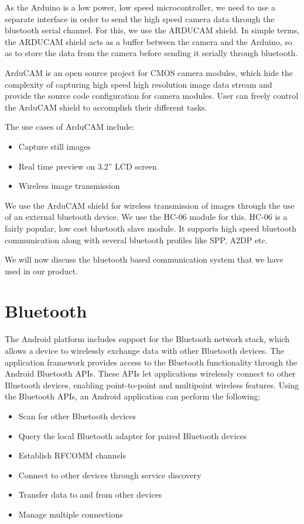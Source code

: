 \documentclass[11pt]{report}
\begin{document}
{{As the Arduino is a low power, low speed microcontroller, we need to use a separate interface in order to send the high speed camera data through the bluetooth serial channel. For this, we use the ARDUCAM shield. In simple terms, the ARDUCAM shield acts as a buffer between the camera and the Arduino, so as to store the data from the camera before sending it serially through bluetooth.

ArduCAM is an open source project for CMOS camera modules, which hide the complexity of capturing high speed high resolution image data stream and provide the source code configuration for camera modules. User can freely control the ArduCAM shield to accomplish their different tasks.

The use cases of ArduCAM include:

\begin{itemize}
\item Capture still images
\item Real time preview on 3.2” LCD screen
\item Wireless image transmission
\end{itemize}

We use the ArduCAM shield for wireless transmission of images through the use of an external bluetooth device. We use the HC-06 module for this. HC-06 is a fairly popular, low cost bluetooth slave module. It supports high speed bluetooth communication along with several bluetooth profiles like SPP, A2DP etc.

We will now discuss the bluetooth based communication system that we have used in our product.
\section{Bluetooth}
The Android platform includes support for the Bluetooth network stack, which allows a device to wirelessly exchange data with other Bluetooth devices. The application framework provides access to the Bluetooth functionality through the Android Bluetooth APIs\cite{androiddevguide}. These APIs let applications wirelessly connect to other Bluetooth devices, enabling point-to-point and multipoint wireless features.
Using the Bluetooth APIs, an Android application can perform the following:

\begin{itemize}
\item Scan for other Bluetooth devices
\item Query the local Bluetooth adapter for paired Bluetooth devices
\item Establish RFCOMM channels
\item Connect to other devices through service discovery
\item Transfer data to and from other devices
\item Manage multiple connections
\end{itemize}

}}
\end{document}
